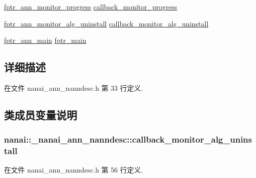 \begin{DoxyCompactItemize}
\item 
\hyperlink{namespacenanai_a5c9964edbd4db8ae35df7cd024020e87}{fptr\+\_\+ann\+\_\+monitor\+\_\+progress} \hyperlink{structnanai_1_1__nanai__ann__nanndesc_aab1e435593bf3710373696cb0b95870d}{callback\+\_\+monitor\+\_\+progress}
\item 
\hyperlink{namespacenanai_a04b231ce428a771ab1a9aace53be65c6}{fptr\+\_\+ann\+\_\+monitor\+\_\+alg\+\_\+uninstall} \hyperlink{structnanai_1_1__nanai__ann__nanndesc_a050e0b19f3e7448581bf09274e5fe436}{callback\+\_\+monitor\+\_\+alg\+\_\+uninstall}
\item 
\hyperlink{namespacenanai_a3be739c74db7d7304ff72dbcefbdc046}{fptr\+\_\+ann\+\_\+main} \hyperlink{structnanai_1_1__nanai__ann__nanndesc_aa6fc7c5e54bf807678ff7320bd792a15}{fptr\+\_\+main}
\end{DoxyCompactItemize}


\subsection{详细描述}


在文件 nanai\+\_\+ann\+\_\+nanndesc.\+h 第 33 行定义.



\subsection{类成员变量说明}
\hypertarget{structnanai_1_1__nanai__ann__nanndesc_a050e0b19f3e7448581bf09274e5fe436}{}
\subsubsection[{callback\+\_\+monitor\+\_\+alg\+\_\+uninstall}]{ nanai\+::\+\_\+nanai\+\_\+ann\+\_\+nanndesc\+::callback\+\_\+monitor\+\_\+alg\+\_\+uninstall}\label{structnanai_1_1__nanai__ann__nanndesc_a050e0b19f3e7448581bf09274e5fe436}


在文件 nanai\+\_\+ann\+\_\+nanndesc.\+h 第 56 行定义.

\hypertarget{structnanai_1_1__nanai__ann__nanndesc_a6e0e1cd8cef94d4a1581d1e32265eac3}{}
